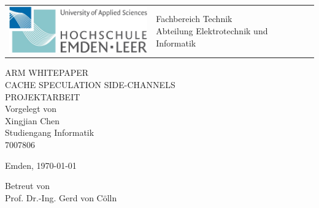 \begin{titlepage}
	
	\vspace{-0.5cm}
	\hspace{-2.0cm}
	\begin{tabular}{p{8.0cm} p{8.0cm}}
		\includegraphics[width = 6.0cm]{img/hsel-allgemein} &
		\parbox[b]{8.0cm}{
			{\large 	Fachbereich Technik }\\
			{\large 	Abteilung Elektrotechnik und Informatik }     
		} \\
		\\
		\hline
	\end{tabular}
	\begin{center}
		
		\vspace{2.5cm}%
		\LARGE{\textsc{ %
			ARM WHITEPAPER}}\\
		
		\vspace{1cm}%
		\LARGE{\textsc{	CACHE SPECULATION SIDE-CHANNELS}}\\
		
		\vspace{2.0cm}%
		\LARGE{\textsc{%
				{PROJEKTARBEIT} %
		}}\\
		
		\vspace{2cm}%
		\large
		Vorgelegt von\\ Xingjian Chen\\ Studiengang Informatik\\ 7007806 
		
		\vspace{1cm} 
		Emden, \today
		
		\vspace{2.5cm}%
		Betreut von\\ Prof. Dr.-Ing. Gerd von Cölln
		
	\end{center}
	\normalsize
\end{titlepage}